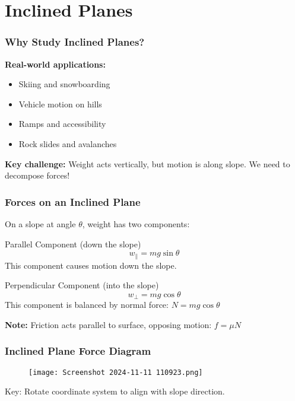 \documentclass{beamer}
\begin{document}
\section{Inclined Planes}

\begin{frame}
\frametitle{Why Study Inclined Planes?}
\textbf{Real-world applications:}
\pause
\begin{itemize}
    \item Skiing and snowboarding
    \pause
    \item Vehicle motion on hills
    \pause
    \item Ramps and accessibility
    \pause
    \item Rock slides and avalanches
\end{itemize}

\vspace{1em}
\pause
\textbf{Key challenge:} Weight acts vertically, but motion is along slope. We need to decompose forces!
\end{frame}

\begin{frame}
\frametitle{Forces on an Inclined Plane}
On a slope at angle $\theta$, weight has two components:
\pause

\begin{block}{Parallel Component (down the slope)}
\[ w_\parallel = mg\sin\theta \]
This component causes motion down the slope.
\end{block}
\pause

\begin{block}{Perpendicular Component (into the slope)}
\[ w_\perp = mg\cos\theta \]
This component is balanced by normal force: $N = mg\cos\theta$
\end{block}
\pause

\vspace{0.5em}
\textbf{Note:} Friction acts parallel to surface, opposing motion: $f = \mu N$
\end{frame}

\begin{frame}
\frametitle{Inclined Plane Force Diagram}
\begin{figure}[H]
    \centering
    \texttt{[image: Screenshot 2024-11-11 110923.png]}
\end{figure}

Key: Rotate coordinate system to align with slope direction.
\end{frame}
\end{document}
